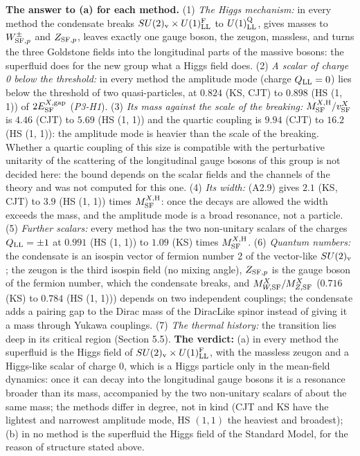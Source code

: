 \documentclass[
  10pt,
]{article}
\begin{document}
\textbf{The answer to (a) for each method.} (1) \emph{The Higgs
mechanism:} in every method the condensate breaks
\(SU(2)_{\rm v}\times U(1)^{\rm F}_{\rm LL}\) to
\(U(1)^{\rm Q}_{\rm LL}\), gives masses to \(W^\pm_{{\rm SF},p}\) and
\(Z_{{\rm SF},p}\), leaves exactly one gauge boson, the zeugon,
massless, and turns the three Goldstone fields into the longitudinal
parts of the massive bosons: the superfluid does for the new group what
a Higgs field does. (2) \emph{A scalar of charge 0 below the threshold:}
in every method the amplitude mode (charge \(Q_{\rm LL}=0\)) lies below
the threshold of two quasi-particles, at \(0.824\) (KS, CJT) to
\(0.898\) (HS (1, 1)) of \(2E^{X,{\rm gap}}_{\rm SF}\) (\emph{P3-H1}).
(3) \emph{Its mass against the scale of the breaking:}
\(M^{X,{\rm H}}_{\rm SF}/v^X_{\rm SF}\) is \(4.46\) (CJT) to \(5.69\)
(HS (1, 1)) and the quartic coupling is \(9.94\) (CJT) to \(16.2\) (HS
(1, 1)): the amplitude mode is heavier than the scale of the breaking.
Whether a quartic coupling of this size is compatible with the
perturbative unitarity of the scattering of the longitudinal gauge
bosons of this group is not decided here: the bound depends on the
scalar fields and the channels of the theory and was not computed for
this one. (4) \emph{Its width:} (A2.9) gives \(2.1\) (KS, CJT) to
\(3.9\) (HS (1, 1)) times \(M^{X,{\rm H}}_{\rm SF}\): once the decays
are allowed the width exceeds the mass, and the amplitude mode is a
broad resonance, not a particle. (5) \emph{Further scalars:} every
method has the two non-unitary scalars of the charges
\(Q_{\rm LL}=\pm1\) at \(0.991\) (HS (1, 1)) to \(1.09\) (KS) times
\(M^{X,{\rm H}}_{\rm SF}\). (6) \emph{Quantum numbers:} the condensate
is an isospin vector of fermion number 2 of the vector-like
\(SU(2)_{\rm v}\); the zeugon is the third isospin field (no mixing
angle), \(Z_{{\rm SF},p}\) is the gauge boson of the fermion number,
which the condensate breaks, and \(M^X_{W,{\rm SF}}/M^X_{Z,{\rm SF}}\)
(\(0.716\) (KS) to \(0.784\) (HS (1, 1))) depends on two independent
couplings; the condensate adds a pairing gap to the Dirac mass of the
DiracLike spinor instead of giving it a mass through Yukawa couplings.
(7) \emph{The thermal history:} the transition lies deep in its critical
region (Section 5.5). \textbf{The verdict:} (a) in every method the
superfluid is the Higgs field of
\(SU(2)_{\rm v}\times U(1)^{\rm F}_{\rm LL}\), with the massless zeugon
and a Higgs-like scalar of charge 0, which is a Higgs particle only in
the mean-field dynamics: once it can decay into the longitudinal gauge
bosons it is a resonance broader than its mass, accompanied by the two
non-unitary scalars of about the same mass; the methods differ in
degree, not in kind (CJT and KS have the lightest and narrowest
amplitude mode, HS \((1,1)\) the heaviest and broadest); (b) in no
method is the superfluid the Higgs field of the Standard Model, for the
reason of structure stated above.
\end{document}
